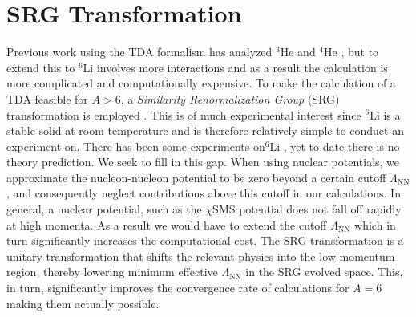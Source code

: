 \documentclass[a4paper,11pt]{article}
\newcommand{\LamNN}{\Lambda_{\mathrm{NN}}}
\newcommand{\LiS}{{}^{6} \mathrm{Li} }
\newcommand{\HeF}{{}^{4} \mathrm{He}}
\newcommand{\HeT}{{}^{3} \mathrm{He}}
\begin{document}
\section{SRG Transformation}
Previous work using the TDA formalism has analyzed
$\HeT$ and $\HeF$
\cite{hammer2020, hammer4He}, but to extend this to $\LiS$ involves more interactions
and as a result the calculation is more complicated and computationally expensive.
To make the calculation of a TDA feasible for $A>6$, a
\textit{Similarity Renormalization Group} (SRG) transformation
is employed \cite{SRG, Furnstahl2013}.
This is of much experimental interest since $\LiS$ is a stable solid at room temperature and is
therefore relatively simple to conduct an experiment on.
There has been some experiments on$\LiS$ \cite{60MeV,86MeV}, yet to date there is no theory prediction.
We seek to fill in this gap.
When using nuclear potentials, we approximate the nucleon-nucleon potential to be zero
beyond a certain cutoff $\LamNN$, and consequently
neglect contributions above this cutoff in our calculations.
In general, a nuclear potential, such as the $\chi$SMS potential \cite{Reinert2018} does
not fall off rapidly at high momenta.
As a result we would have to
extend the cutoff $\LamNN$ which in turn significantly increases the computational cost.
The SRG transformation is a unitary transformation that
shifts the relevant physics into the low-momentum
region, thereby lowering minimum effective $\LamNN$ in the SRG evolved space.
This, in turn, significantly improves the convergence rate of calculations for $A=6$ making them actually possible.
\end{document}
